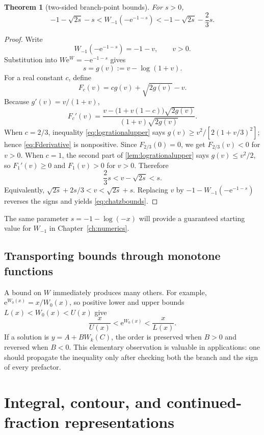 \documentclass[11pt,oneside]{book}
\newtheorem{theorem}{Theorem}[chapter]
\theoremstyle{definition}
\theoremstyle{remark}
\newcommand{\ee}{\mathrm e}
\begin{document}
\begin{theorem}[two-sided branch-point bounds]\label{thm:chatzbounds}
For $s>0$,
\begin{equation}\label{eq:chatzbounds}
 -1-\sqrt{2s}-s
 <W_{-1}\!\left(-\ee^{-1-s}\right)
 <-1-\sqrt{2s}-\frac23s.
\end{equation}
\end{theorem}

\begin{proof}
Write
\[
 W_{-1}(-\ee^{-1-s})=-1-v,
 \qquad v>0.
\]
Substitution into $W\ee^W=-\ee^{-1-s}$ gives
\begin{equation}\label{eq:sgv}
 s=g(v):=v-\log(1+v).
\end{equation}
For a real constant $c$, define
\[
 F_c(v)=c g(v)+\sqrt{2g(v)}-v.
\]
Because $g'(v)=v/(1+v)$,
\begin{equation}\label{eq:Fderivative}
 F_c'(v)=
 \frac{v-\bigl(1+v(1-c)\bigr)\sqrt{2g(v)}}
 {(1+v)\sqrt{2g(v)}}.
\end{equation}
When $c=2/3$, inequality \eqref{eq:logrationalupper} says
$g(v)\ge v^2/[2(1+v/3)^2]$; hence \eqref{eq:Fderivative} is nonpositive.
Since $F_{2/3}(0)=0$, we get
$F_{2/3}(v)<0$ for $v>0$.  When $c=1$, the second part of
\cref{lem:logrationalupper} says $g(v)\le v^2/2$, so
$F_1'(v)\ge0$ and $F_1(v)>0$ for $v>0$.  Therefore
\[
 \frac23s<v-\sqrt{2s}<s.
\]
Equivalently,
$\sqrt{2s}+2s/3<v<\sqrt{2s}+s$.  Replacing $v$ by
$-1-W_{-1}(-\ee^{-1-s})$ reverses the signs and yields
\eqref{eq:chatzbounds}.
\end{proof}

The same parameter $s=-1-\log(-x)$ will provide a guaranteed starting value
for $W_{-1}$ in Chapter~\ref{ch:numerics}.

\section{Transporting bounds through monotone functions}

A bound on $W$ immediately produces many others.  For example,
$\ee^{W_0(x)}=x/W_0(x)$, so positive lower and upper bounds
$L(x)<W_0(x)<U(x)$ give
\[
 \frac{x}{U(x)}<\ee^{W_0(x)}<\frac{x}{L(x)}.
\]
If a solution is $y=A+B W_k(C)$, the order is preserved when $B>0$ and
reversed when $B<0$.  This elementary observation is valuable in applications:
one should propagate the inequality only after checking both the branch and
the sign of every prefactor.


\chapter{Integral, contour, and continued-fraction representations}
\label{ch:representations}
\end{document}
